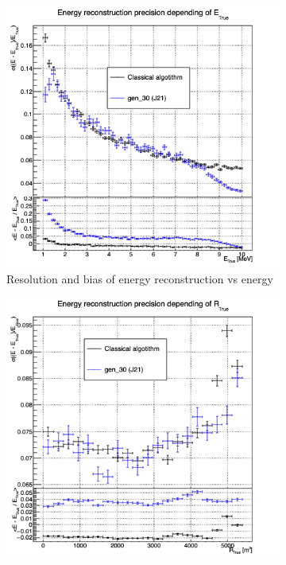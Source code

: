\begin{figure}[ht]
  \centering
  \begin{subfigure}[t]{0.32\linewidth}
    \centering
    \includegraphics[width=\linewidth]{images/jcnn/vic_cnn/multi_vic_cnn_MESBvETC.png}
    \caption{Resolution and bias of energy reconstruction vs energy}
    \label{fig:jcnn:vic_cnn:multi_vic_cnn_MESBvETC}
  \end{subfigure}
  \begin{subfigure}[t]{0.32\linewidth}
    \centering
    \includegraphics[width=\linewidth]{images/jcnn/vic_cnn/multi_vic_cnn_MESBvRTC.png}

\end{subfigure}
\end{figure}
